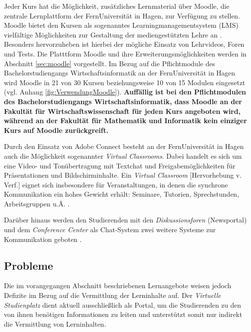 Jeder Kurs hat die Möglichkeit, zusätzliches Lernmaterial über Moodle, die zentrale Lernplattform der FernUniversität in Hagen, zur Verfügung zu stellen. Moodle bietet den Kursen \glqq als sogenanntes Learningmanagementsystem (LMS) vielfältige Möglichkeiten zur Gestaltung der mediengestützten Lehre an\grqq{} \citep{fernuniversitaet2018moodle}. Besonders hervorzuheben ist hierbei der mögliche Einsatz von Lehrvideos, Foren und Tests. Die Platttform Moodle und ihre Erweiterungsmöglichkeiten werden in Abschnitt \ref{sec:moodle} vorgestellt. Im Bezug auf die Pflichtmodule des Bachelorstudiengangs Wirtschaftsinformatik an der FernUniversität in Hagen wird Moodle in 21 von 30 Kursen beziehungsweise 10 von 15 Modulen eingesetzt (vgl. Anhang \ref{fig:VerwendungMoodle}). \textbf{Auffällig ist bei den Pflichtmodulen des Bachelorstudiengangs Wirtschaftsinformatik, dass Moodle an der Fakultät für Wirtschaftswissenschaft für jeden Kurs angeboten wird, während an der Fakultät für Mathematik und Informatik kein einziger Kurs auf Moodle zurückgreift.}

Durch den Einsatz von Adobe Connect besteht an der FernUniversität in Hagen auch die Möglichkeit sogenannter \textit{Virtual Classrooms}. Dabei handelt es sich um eine Video- und Tonübertragung mit Textchat und Freigabemöglichkeiten für Präsentationen und Bildschirminhalte. \glqq Ein \emph{Virtual Classroom} [Hervorhebung v. Verf.] eignet sich insbesondere für Veranstaltungen, in denen die synchrone Kommunikation ein hohes Gewicht erhält: Seminare, Tutorien, Sprechstunden, Arbeitsgruppen u.Ä.\grqq{} \citep{fernuniversitaet2018kommunikationstools}.

Darüber hinaus werden den Studierenden mit den \textit{Diskussionsforen} (Newsportal) und dem \textit{Conference Center} als Chat-System zwei weitere Systeme zur Kommunikation geboten \citep{fernuniversitaet2018kommunikationstools}.


\subsection{Probleme}
Die im vorangegangen Abschnitt beschriebenen Lernangebote weisen jedoch Defizite im Bezug auf die Vermittlung der Lerninhalte auf. Der \textit{Virtuelle Studienplatz} dient aktuell ausschließlich als Portal, um die Studierenden zu den von ihnen benötigen Informationen zu leiten und unterstützt somit nur indirekt die Vermittlung von Lerninhalten.


